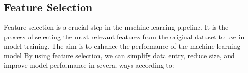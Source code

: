 \documentclass[12pt]{report}
\begin{document}





\subsection*{Feature Selection}
Feature selection is a crucial step in the machine learning pipeline. It is the
process of selecting the most relevant features from the original dataset to
use in model training. The aim is to enhance the performance of the machine
learning model By using feature selection, we can simplify data entry, reduce
size, and improve model performance in several ways according to\cite{guyon2003introduction}:
\end{document}
